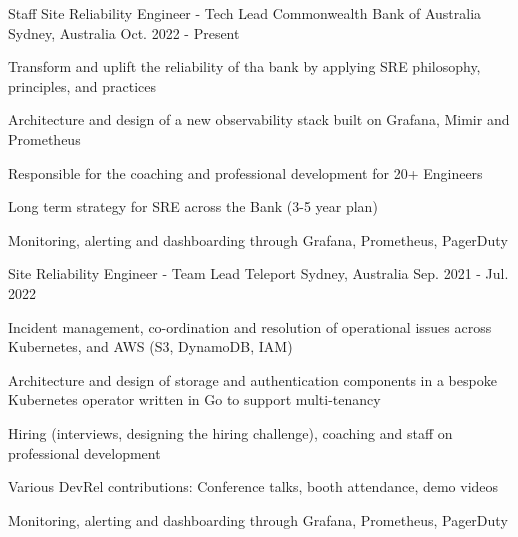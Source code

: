 

\begin{cventries}
  \cventry
    {Staff Site Reliability Engineer - Tech Lead} %
    {Commonwealth Bank of Australia} %
    {Sydney, Australia} %
    {Oct. 2022 - Present} %
    {
      \begin{cvitems} %
      \item {Transform and uplift the reliability of tha bank by applying SRE philosophy, principles, and practices} 
      \item {Architecture and design of a new observability stack built on Grafana, Mimir and Prometheus}
      \item {Responsible for the coaching and professional development for 20+ Engineers}
      \item {Long term strategy for SRE across the Bank (3-5 year plan)}
      \item {Monitoring, alerting and dashboarding through Grafana, Prometheus, PagerDuty}
      \end{cvitems}
    }


  \cventry
    {Site Reliability Engineer - Team Lead} %
    {Teleport} %
    {Sydney, Australia} %
    {Sep. 2021 - Jul. 2022} %
    {
      \begin{cvitems} %
      \item {Incident management, co-ordination and resolution of operational issues across Kubernetes, and AWS (S3, DynamoDB, IAM)}
        \item {Architecture and design of storage and authentication components in a bespoke Kubernetes operator written in Go to support multi-tenancy}
        \item {Hiring (interviews, designing the hiring challenge), coaching and staff on professional development}
        \item {Various DevRel contributions: Conference talks, booth attendance, demo videos }
        \item {Monitoring, alerting and dashboarding through Grafana, Prometheus, PagerDuty}
      \end{cvitems}
    }



\end{cventries}
